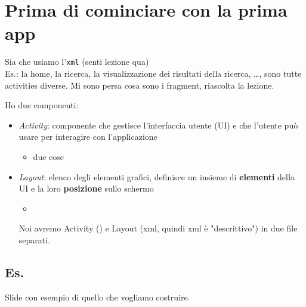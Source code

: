 \section{Prima di cominciare con la prima app}
\par Sia che usiamo l'\texttt{xml} (senti lezione qua)\\
Es.: la home, la ricerca, la visualizzazione dei risultati della ricerca, \dots, sono tutte activities diverse. Mi sono persa cosa sono i fragment, riascolta la lezione.
\par Ho due componenti:
\begin{itemize}
    \item \textit{Activity}: componente che gestisce l'interfaccia utente (UI) e che l'utente può usare per interagire con l'applicazione
    \begin{itemize}
        \item due cose
    \end{itemize}
    \item \textit{Layout}: elenco degli elementi grafici, definisce un insieme di \textbf{elementi} della UI e la loro \textbf{posizione} sullo schermo
    \begin{itemize}
        \item 
    \end{itemize}
    \par Noi avremo Activity () e Layout (xml, quindi xml è "descrittivo") in due file separati.
\end{itemize}

\subsection{Es.}
\par Slide con esempio di quello che vogliamo costruire.

